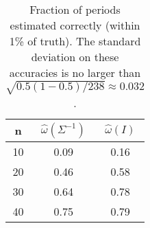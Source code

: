 \begin{table}[ht]
\centering
\begin{tabular}{c|cc}
n & $\widehat{\omega}(\Sigma^{-1})$ &  $\widehat{\omega}(I)$ \\
  \hline10&0.09&0.16\\20&0.46&0.58\\30&0.64&0.78\\40&0.75&0.79\\\hline
\end{tabular}
\caption{Fraction of periods estimated correctly (within 1\% of truth). The standard deviation on these accuracies is no larger than $\sqrt{0.5(1-0.5)/238} \approx 0.032$.}
\label{tab:period_est_results}
\end{table}
